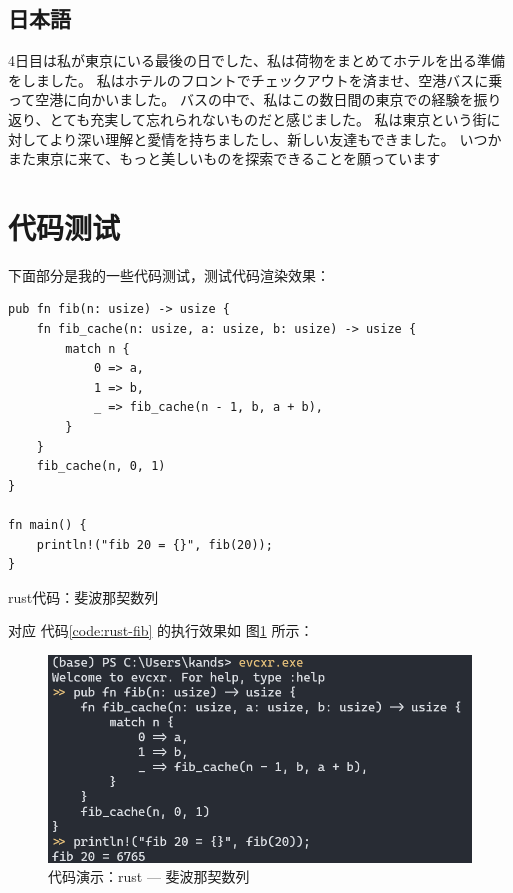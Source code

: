 \documentclass{kspaper}
\begin{document}
\subsection{日本語}

4日目は私が東京にいる最後の日でした、私は荷物をまとめてホテルを出る準備をしました。
私はホテルのフロントでチェックアウトを済ませ、空港バスに乗って空港に向かいました。
バスの中で、私はこの数日間の東京での経験を振り返り、とても充実して忘れられないものだと感じました。
私は東京という街に対してより深い理解と愛情を持ちましたし、新しい友達もできました。
いつかまた東京に来て、もっと美しいものを探索できることを願っています

\section{代码测试}

下面部分是我的一些代码测试，测试代码渲染效果：

\begin{table}[H]
    \begin{verbatim}
pub fn fib(n: usize) -> usize {
    fn fib_cache(n: usize, a: usize, b: usize) -> usize {
        match n {
            0 => a,
            1 => b,
            _ => fib_cache(n - 1, b, a + b),
        }
    }
    fib_cache(n, 0, 1)
}

fn main() {
    println!("fib 20 = {}", fib(20));
}
    \end{verbatim}
    \caption{rust代码：斐波那契数列}
    \label{code:rust-fib}
\end{table}

对应 代码\ref{code:rust-fib} 的执行效果如 图\ref{fig:rust-fib} 所示：

\begin{figure}[H]
    \centering
    \includegraphics[scale=0.64]{pics/rust-fib.png}
    \caption{代码演示：rust --- 斐波那契数列}
    \label{fig:rust-fib}
\end{figure}
\end{document}
